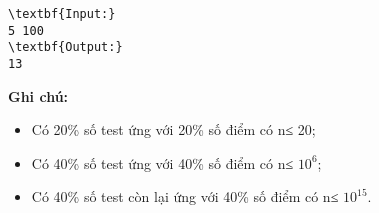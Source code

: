 \begin{verbatim}
\textbf{Input:}
5 100
\textbf{Output:}
13
\end{verbatim}

\textbf{\textbf{Ghi chú:}}
\begin{itemize}
	\item Có 20\% số test ứng với 20\% số điểm có n≤ 20;
	\item Có 40\% số test ứng với 40\% số điểm có n≤ $10^{6}$;
	\item Có 40\% số test còn lại ứng với 40\% số điểm có n≤ $10^{15}$.
\end{itemize}
